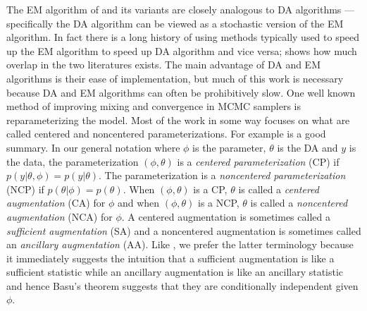 \documentclass{article}
\begin{document}
The EM algorithm of  and its variants are closely analogous to DA algorithms --- specifically the DA algorithm can be viewed as a stochastic version of the EM algorithm. In fact there is a long history of using methods typically used to speed up the EM algorithm to speed up DA algorithm and vice versa;  shows how much overlap in the two literatures exists. The main advantage of DA and EM algorithms is their ease of implementation, but much of this work is necessary because DA and EM algorithms can often be prohibitively slow. One well known method of improving mixing and convergence in MCMC samplers is reparameterizing the model. Most of the work in some way focuses on what are called centered and noncentered parameterizations. For example  is a good summary. In our general notation where $\phi$ is the parameter, $\theta$ is the DA and $y$ is the data, the parameterization $(\phi,\theta)$ is a {\it centered parameterization} (CP) if $p(y|\theta,\phi)=p(y|\theta)$. The parameterization is a {\it noncentered parameterization} (NCP) if $p(\theta|\phi)=p(\theta)$. When $(\phi,\theta)$ is a CP, $\theta$ is called a {\it centered augmentation} (CA) for $\phi$ and when $(\phi,\theta)$ is a NCP, $\theta$ is called a {\it noncentered augmentation} (NCA) for $\phi$. A centered augmentation is sometimes called a {\it sufficient augmentation} (SA) and a noncentered augmentation is sometimes called an {\it ancillary augmentation} (AA)\cite{yu2011center}. Like , we prefer the latter terminology because it immediately suggests the intuition that a sufficient augmentation is like a sufficient statistic while an ancillary augmentation is like an ancillary statistic and hence Basu's theorem suggests that they are conditionally independent given $\phi$. 
\end{document}
